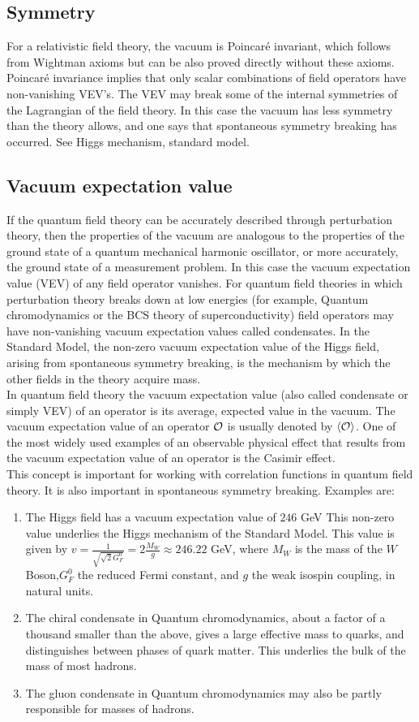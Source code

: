\subsection{Symmetry}
For a relativistic field theory, the vacuum is Poincaré invariant, which follows from Wightman axioms but can be also proved directly without these axioms. Poincaré invariance implies that only scalar combinations of field operators have non-vanishing VEV's. The VEV may break some of the internal symmetries of the Lagrangian of the field theory. In this case the vacuum has less symmetry than the theory allows, and one says that spontaneous symmetry breaking has occurred. See Higgs mechanism, standard model.
\subsection{Vacuum expectation value}
If the quantum field theory can be accurately described through perturbation theory, then the properties of the vacuum are analogous to the properties of the ground state of a quantum mechanical harmonic oscillator, or more accurately, the ground state of a measurement problem. In this case the vacuum expectation value (VEV) of any field operator vanishes. For quantum field theories in which perturbation theory breaks down at low energies (for example, Quantum chromodynamics or the BCS theory of superconductivity) field operators may have non-vanishing vacuum expectation values called condensates. In the Standard Model, the non-zero vacuum expectation value of the Higgs field, arising from spontaneous symmetry breaking, is the mechanism by which the other fields in the theory acquire mass.\\
In quantum field theory the vacuum expectation value (also called condensate or simply VEV) of an operator is its average, expected value in the vacuum. The vacuum expectation value of an operator $\mathcal{O}$ is usually denoted by $\expval{\mathcal{O}}$. One of the most widely used examples of an observable physical effect that results from the vacuum expectation value of an operator is the Casimir effect.\\
This concept is important for working with correlation functions in quantum field theory. It is also important in spontaneous symmetry breaking. Examples are:
\begin{enumerate}
	\item The Higgs field has a vacuum expectation value of $246$ GeV This non-zero value underlies the Higgs mechanism of the Standard Model. This value is given by $v=\frac{1}{\sqrt {{\sqrt {2}}G^{0}_{F}}}=2\frac{M_{W}}{g}\approx 246.22$ GeV, where $M_W$ is the mass of the $W$ Boson,$G^{0}_F$ the reduced Fermi constant, and $g$ the weak isospin coupling, in natural units.
	\item The chiral condensate in Quantum chromodynamics, about a factor of a thousand smaller than the above, gives a large effective mass to quarks, and distinguishes between phases of quark matter. This underlies the bulk of the mass of most hadrons.
	\item The gluon condensate in Quantum chromodynamics may also be partly responsible for masses of hadrons.
\end{enumerate}
